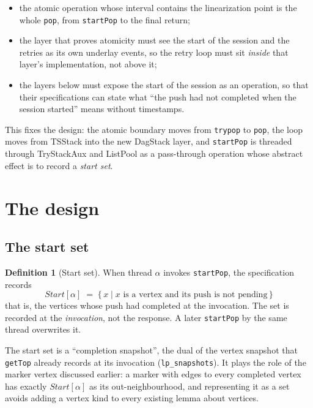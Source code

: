 \documentclass[11pt]{article}
\theoremstyle{definition}
\newtheorem{definition}[lemma]{Definition}
\theoremstyle{remark}
\newcommand{\code}[1]{\texttt{#1}}
\newcommand{\Start}{\mathit{Start}}
\begin{document}
\begin{itemize}[nosep]
\item the atomic operation whose interval contains the linearization point
  is the whole \code{pop}, from \code{startPop} to the final return;
\item the layer that proves atomicity must see the start of the session
  and the retries as its own underlay events, so the retry loop must sit
  \emph{inside} that layer's implementation, not above it;
\item the layers below must expose the start of the session as an
  operation, so that their specifications can state what ``the push had
  not completed when the session started'' means without timestamps.
\end{itemize}

This fixes the design: the atomic boundary moves from \code{trypop} to
\code{pop}, the loop moves from TSStack into the new DagStack layer, and
\code{startPop} is threaded through TryStackAux and ListPool as a
pass-through operation whose abstract effect is to record a
\emph{start set}.

\section{The design}
\label{sec:design}

\subsection{The start set}

\begin{definition}[Start set]
When thread $\alpha$ invokes \code{startPop}, the specification records
\[
\Start[\alpha] \;=\; \{\, x \mid x \text{ is a vertex and its push is not pending}\,\}
\]
that is, the vertices whose push had completed at the invocation. The set
is recorded at the \emph{invocation}, not the response. A later
\code{startPop} by the same thread overwrites it.
\end{definition}

The start set is a ``completion snapshot'', the dual of the vertex
snapshot that \code{getTop} already records at its invocation
(\code{lp\_snapshots}). It plays the role of the marker vertex discussed
earlier: a marker with edges to every completed vertex has exactly
$\Start[\alpha]$ as its out-neighbourhood, and representing it as a set
avoids adding a vertex kind to every existing lemma about vertices.
\end{document}
